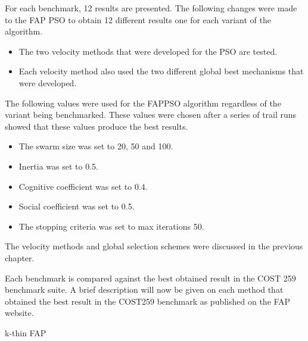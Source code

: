 For each benchmark, 12 results are presented. The following changes were made to the FAP PSO to obtain 12 different results one for each variant of the algorithm.
\begin{itemize}
\item The two velocity methods that were developed for the PSO are tested.
\item Each velocity method also used the two different global best mechanisms that were developed.
\end{itemize}
The following values were used for the FAPPSO algorithm regardless of the variant being benchmarked. These values were chosen after a series of trail runs showed that these values produce the best results.
\begin{itemize}
\item The swarm size was set to 20, 50 and 100.
\item Inertia was set to 0.5.
\item Cognitive coefficient was set to 0.4.
\item Social coefficient was set to 0.5.
\item The stopping criteria was set to max iterations 50.
\end{itemize}
The velocity methods and global selection schemes were discussed in the previous chapter.

Each benchmark is compared against the best obtained result in the COST 259 benchmark suite. A brief description will now be given on each method that obtained the best result in the COST259 benchmark as published on the FAP website.
\begin{description}
    \item{k-thin FAP}
\end{description}

